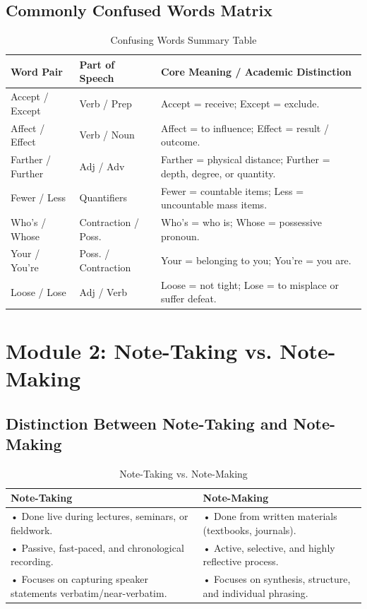 \documentclass[11pt, a4paper]{article}
\begin{document}
\subsection{Commonly Confused Words Matrix}
\begin{table}[htbp]
\centering
\small
\caption{Confusing Words Summary Table}
\begin{tabular}{llp{8.5cm}}
\toprule
\textbf{Word Pair} & \textbf{Part of Speech} & \textbf{Core Meaning / Academic Distinction} \\
\midrule
Accept / Except & Verb / Prep & Accept = receive; Except = exclude. \\
Affect / Effect & Verb / Noun & Affect = to influence; Effect = result / outcome. \\
Farther / Further & Adj / Adv & Farther = physical distance; Further = depth, degree, or quantity. \\
Fewer / Less & Quantifiers & Fewer = countable items; Less = uncountable mass items. \\
Who's / Whose & Contraction / Poss. & Who's = who is; Whose = possessive pronoun. \\
Your / You're & Poss. / Contraction & Your = belonging to you; You're = you are. \\
Loose / Lose & Adj / Verb & Loose = not tight; Lose = to misplace or suffer defeat. \\
\bottomrule
\end{tabular}
\end{table}

\newpage

\section{Module 2: Note-Taking vs. Note-Making}

\subsection{Distinction Between Note-Taking and Note-Making}
\begin{table}[htbp]
\centering
\small
\caption{Note-Taking vs. Note-Making}
\begin{tabular}{p{7.5cm}p{7.5cm}}
\toprule
\textbf{Note-Taking} & \textbf{Note-Making} \\
\midrule
• Done live during lectures, seminars, or fieldwork. & • Done from written materials (textbooks, journals). \\
• Passive, fast-paced, and chronological recording. & • Active, selective, and highly reflective process. \\
• Focuses on capturing speaker statements verbatim/near-verbatim. & • Focuses on synthesis, structure, and individual phrasing. \\
\bottomrule
\end{tabular}
\end{table}
\end{document}
